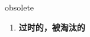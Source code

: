 
\begin{frame}
{\huge obsolete}
\begin{center}
\begin{enumerate}\Large
  \item \textbf{过时的，被淘汰的}
\end{enumerate}
\end{center}
\end{frame}
